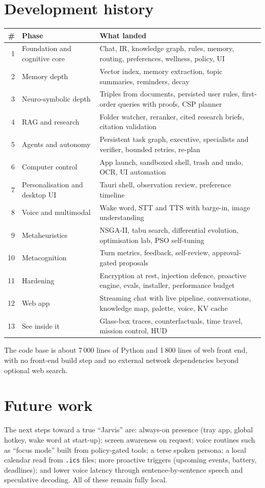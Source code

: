 \documentclass[11pt,a4paper]{article}
\newcommand{\code}[1]{\texttt{#1}}
\begin{document}
\section{Development history}
\begin{center}
\small
\begin{tabularx}{\linewidth}{@{}r l X@{}}
\toprule
\# & Phase & What landed \\
\midrule
1 & Foundation and cognitive core & Chat, IR, knowledge graph, rules, memory, routing, preferences, wellness, policy, UI \\
2 & Memory depth & Vector index, memory extraction, topic summaries, reminders, decay \\
3 & Neuro-symbolic depth & Triples from documents, persisted user rules, first-order queries with proofs, CSP planner \\
4 & RAG and research & Folder watcher, reranker, cited research briefs, citation validation \\
5 & Agents and autonomy & Persistent task graph, executive, specialists and verifier, bounded retries, re-plan \\
6 & Computer control & App launch, sandboxed shell, trash and undo, OCR, UI automation \\
7 & Personalisation and desktop UI & Tauri shell, observation review, preference timeline \\
8 & Voice and multimodal & Wake word, STT and TTS with barge-in, image understanding \\
9 & Metaheuristics & NSGA-II, tabu search, differential evolution, optimisation lab, PSO self-tuning \\
10 & Metacognition & Turn metrics, feedback, self-review, approval-gated proposals \\
11 & Hardening & Encryption at rest, injection defence, proactive engine, evals, installer, performance budget \\
12 & Web app & Streaming chat with live pipeline, conversations, knowledge map, palette, voice, KV cache \\
13 & See inside it & Glass-box traces, counterfactuals, time travel, mission control, HUD \\
\bottomrule
\end{tabularx}
\end{center}
The code base is about 7\,000 lines of Python and 1\,800 lines of web front end, with no front-end build step and no external network dependencies beyond optional web search.

\section{Future work}
The next steps toward a true ``Jarvis'' are: always-on presence (tray app, global hotkey, wake word at start-up); screen awareness on request; voice routines such as ``focus mode'' built from policy-gated tools; a terse spoken persona; a local calendar read from \code{.ics} files; more proactive triggers (upcoming events, battery, deadlines); and lower voice latency through sentence-by-sentence speech and speculative decoding. All of these remain fully local.
\end{document}
